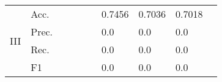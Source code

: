 \begin{tabular}{clllllllll}
    \midrule
    \multirow{4}{*}{III}              & Acc.                                                 &                         &                         &                              &                         & 0.7456                                                                       & 0.7036                                                                      & 0.7018                                    &                                           \\
                                      & Prec.                                                &                         &                         &                              &                         & 0.0                                                                         & 0.0                                                                        & 0.0                                      &                                           \\
                                      & Rec.                                                &                         &                         &                              &                         & 0.0                                                                         & 0.0                                                                        & 0.0                                      &                                           \\
                                      & F1                                                   &                         &                         &                              &                         & 0.0                                                                         & 0.0                                                                        & 0.0                                      &                                           \\
    \bottomrule
    \end{tabular}